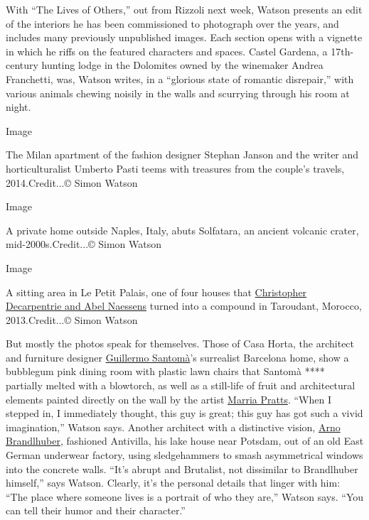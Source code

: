 With ``The Lives of Others,'' out from Rizzoli next week, Watson
presents an edit of the interiors he has been commissioned to photograph
over the years, and includes many previously unpublished images. Each
section opens with a vignette in which he riffs on the featured
characters and spaces. Castel Gardena, a 17th-century hunting lodge in
the Dolomites owned by the winemaker Andrea Franchetti, was, Watson
writes, in a ``glorious state of romantic disrepair,'' with various
animals chewing noisily in the walls and scurrying through his room at
night.

Image

The Milan apartment of the fashion designer Stephan Janson and the
writer and horticulturalist Umberto Pasti teems with treasures from the
couple's travels, 2014.Credit...© Simon Watson

Image

A private home outside Naples, Italy, abuts Solfatara, an ancient
volcanic crater, mid-2000s.Credit...© Simon Watson

Image

A sitting area in Le Petit Palais, one of four houses that
\href{https://www.nytimes3xbfgragh.onion/2013/05/09/t-magazine/taroudant-lost-in-time.html}{Christopher
Decarpentrie and Abel Naessens} turned into a compound in Taroudant,
Morocco, 2013.Credit...© Simon Watson

But mostly the photos speak for themselves. Those of Casa Horta, the
architect and furniture designer
\href{https://www.nytimes3xbfgragh.onion/2018/08/27/t-magazine/architect-guillermo-santoma-casa-horta-barcelona.html}{Guillermo
Santomà}'s surrealist Barcelona home, show a bubblegum pink dining room
with plastic lawn chairs that Santomà **** partially melted with a
blowtorch, as well as a still-life of fruit and architectural elements
painted directly on the wall by the artist
\href{https://www.instagram.com/marriapratts/}{Marria Pratts}. ``When I
stepped in, I immediately thought, this guy is great; this guy has got
such a vivid imagination,'' Watson says. Another architect with a
distinctive vision,
\href{https://www.nytimes3xbfgragh.onion/2016/03/10/t-magazine/arno-brandlhuber-brutalist-architecture-home.html}{Arno
Brandlhuber}, fashioned Antivilla, his lake house near Potsdam, out of
an old East German underwear factory, using sledgehammers to smash
asymmetrical windows into the concrete walls. ``It's abrupt and
Brutalist, not dissimilar to Brandlhuber himself,'' says Watson.
Clearly, it's the personal details that linger with him: ``The place
where someone lives is a portrait of who they are,'' Watson says. ``You
can tell their humor and their character.''

